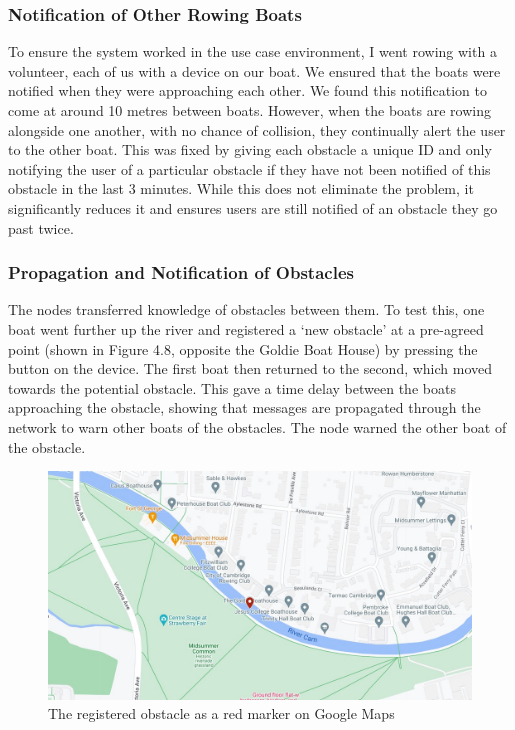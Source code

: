 \documentclass[12pt,a4paper]{report}
\begin{document}
\subsubsection{Notification of Other Rowing Boats}
To ensure the system worked in the use case environment, I went rowing with a volunteer, each of us with a device on our boat. We ensured that the boats were notified when they were approaching each other. We found this notification to come at around 10 metres between boats. However, when the boats are rowing alongside one another, with no chance of collision, they continually alert the user to the other boat. This was fixed by giving each obstacle a unique ID and only notifying the user of a particular obstacle if they have not been notified of this obstacle in the last 3 minutes. While this does not eliminate the problem, it significantly reduces it and ensures users are still notified of an obstacle they go past twice. \\
\subsubsection{Propagation and Notification of Obstacles}
The nodes transferred knowledge of obstacles between them. To test this, one boat went further up the river and registered a `new obstacle' at a pre-agreed point (shown in Figure 4.8, opposite the Goldie Boat House) by pressing the button on the device. The first boat then returned to the second, which moved towards the potential obstacle. This gave a time delay between the boats approaching the obstacle, showing that messages are propagated through the network to warn other boats of the obstacles. The node warned the other boat of the obstacle. 
\begin{figure}[h]
\begin{center}
\includegraphics[scale=0.3]{obstacle.jpg}
\end{center}
\caption{The registered obstacle as a red marker on Google Maps \cite{googlemapsgeneral}}
\end{figure}
\end{document}
